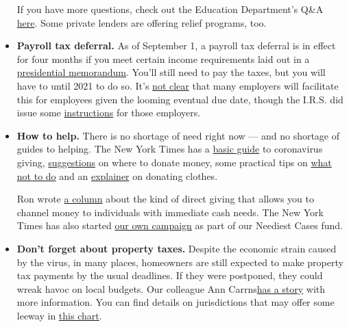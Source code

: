 \begin{itemize}
  If you have more questions, check out the Education Department's Q\&A
  \href{https://studentaid.gov/announcements-events/coronavirus\#borrower-questions}{here}.
  Some private lenders are offering relief programs, too.
\item
  \textbf{Payroll tax deferral.} As of September 1, a payroll tax
  deferral is in effect for four months if you meet certain income
  requirements laid out in a
  \href{https://www.whitehouse.gov/presidential-actions/memorandum-deferring-payroll-tax-obligations-light-ongoing-covid-19-disaster/}{presidential
  memorandum}. You'll still need to pay the taxes, but you will have to
  until 2021 to do so. It's
  \href{https://www.nytimes3xbfgragh.onion/2020/08/28/us/politics/trump-tax-holiday-bill-due.html?action=click\&module=RelatedLinks\&pgtype=Article}{not
  clear} that many employers will facilitate this for employees given
  the looming eventual due date, though the I.R.S. did issue some
  \href{https://www.irs.gov/pub/irs-drop/n-20-65.pdf}{instructions} for
  those employers.
\item
  \textbf{How to help.} There is no shortage of need right now --- and
  no shortage of guides to helping. The New York Times has a
  \href{https://www.nytimes3xbfgragh.onion/article/coronavirus-how-to-help-donations-charities.html}{basic
  guide} to coronavirus giving,
  \href{https://www.nytimes3xbfgragh.onion/2020/03/27/smarter-living/coronavirus-charity-donations.html}{suggestions}
  on where to donate money, some practical tips on
  \href{https://www.nytimes3xbfgragh.onion/2020/04/10/nyregion/coronavirus-help-healthcare-workers.html}{what
  not to do} and an
  \href{https://www.nytimes3xbfgragh.onion/2020/04/13/style/self-care/donate-clothes-coronavirus.html}{explainer}
  on donating clothes.

  Ron wrote
  \href{https://www.nytimes3xbfgragh.onion/2020/05/30/your-money/philanthropy-charity-giving-coronavirus.html}{a
  column} about the kind of direct giving that allows you to channel
  money to individuals with immediate cash needs. The New York Times has
  also started
  \href{https://www.nytimes3xbfgragh.onion/2020/04/01/reader-center/neediest-cases-covid-19-relief-campaign.html}{our
  own campaign} as part of our Neediest Cases fund.
\item
  \textbf{Don't forget about property taxes.} Despite the economic
  strain caused by the virus, in many places, homeowners are still
  expected to make property tax payments by the usual deadlines. If they
  were postponed, they could wreak havoc on local budgets. Our colleague
  Ann
  Carrns\href{https://www.nytimes3xbfgragh.onion/2020/04/10/your-money/coronavirus-property-taxes.html?campaign_id=12\&emc=edit_my_20200413\&instance_id=17606\&nl=your-money\&regi_id=8921505\&segment_id=25000\&te=1\&user_id=1f51a0e7a2edf91cad2fd25cabf8cd78}{has
  a story} with more information. You can find details on jurisdictions
  that may offer some leeway in
  \href{https://www.inmyarea.com/research/covid-property-tax-breaks-by-state\#special-relief-program-deadline-extensions}{this
  chart}.


\end{itemize}
